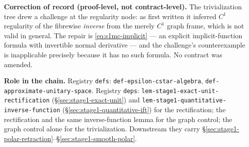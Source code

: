 \noindent\textbf{Correction of record (proof-level, not contract-level).} The
trivialization tree drew a challenge at the regularity node: as first written it inferred
$C^{1}$ regularity of the fibrewise \emph{inverse} from the merely $C^{1}$ graph frame,
which is not valid in general. The repair is \eqref{eq:s1mc-implicit} --- an explicit
implicit-function formula with invertible normal derivative --- and the challenge's
counterexample is inapplicable precisely because it has no such formula. No contract was
amended.

\noindent\textbf{Role in the chain.} Registry \texttt{defs}:
\texttt{def-epsilon-cstar-algebra}, \texttt{def-approximate-unitary-space}. Registry
\texttt{deps}: \texttt{lem-stage1-exact-unit-rectification} (\S\ref{sec:stage1-exact-unit})
and \texttt{lem-stage1-quantitative-inverse-function} (\S\ref{sec:stage1-quantitative-ift})
for the rectification; the rectification and the same inverse-function lemma for the graph
control; the graph control alone for the trivialization. Downstream they carry
\S\ref{sec:stage1-polar-retraction}--\S\ref{sec:stage1-smooth-polar}.
